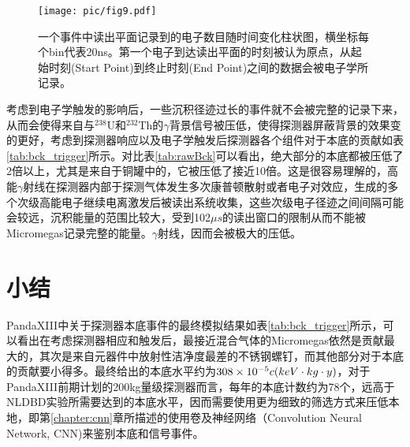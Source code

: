 \begin{figure}
    \centering
    \texttt{[image: pic/fig9.pdf]}
    \caption{一个事件中读出平面记录到的电子数目随时间变化柱状图，横坐标每个bin代表20ns。第一个电子到达读出平面的时刻被认为原点，从起始时刻(Start Point)到终止时刻(End Point)之间的数据会被电子学所记录。}
    \label{fig:trigger}
\end{figure}

考虑到电子学触发的影响后，一些沉积径迹过长的事件就不会被完整的记录下来，从而会使得来自与$^{238}$U和$^{232}$Th的$\gamma$背景信号被压低，使得探测器屏蔽背景的效果变的更好，考虑到探测器响应以及电子学触发后探测器各个组件对于本底的贡献如表\ref{tab:bck_trigger}所示。对比表\ref{tab:rawBck}可以看出，绝大部分的本底都被压低了2倍以上，尤其是来自于铜罐中的，它被压低了接近10倍。这是很容易理解的，高能$\gamma$射线在探测器内部于探测气体发生多次康普顿散射或者电子对效应，生成的多个次级高能电子继续电离激发后被读出系统收集，这些次级电子径迹之间间隔可能会较远，沉积能量的范围比较大，受到102$\mu s$的读出窗口的限制从而不能被Micromegas记录完整的能量。$\gamma$射线，因而会被极大的压低。

\section{小结}

PandaXIII中关于探测器本底事件的最终模拟结果如表\ref{tab:bck_trigger}所示，可以看出在考虑探测器相应和触发后，最接近混合气体的Micromegas依然是贡献最大的，其次是来自元器件中放射性洁净度最差的不锈钢螺钉，而其他部分对于本底的贡献要小得多。最终给出的本底水平约为$308\times 10^{-5}c\/(keV\cdot kg\cdot y)$，对于PandaXIII前期计划的200kg量级探测器而言，每年的本底计数约为78个，远高于NLDBD实验所需要达到的本底水平，因而需要使用更为细致的筛选方式来压低本地，即第\ref{chapter:cnn}章所描述的使用卷及神经网络（Convolution Neural Network, CNN)来鉴别本底和信号事件。

